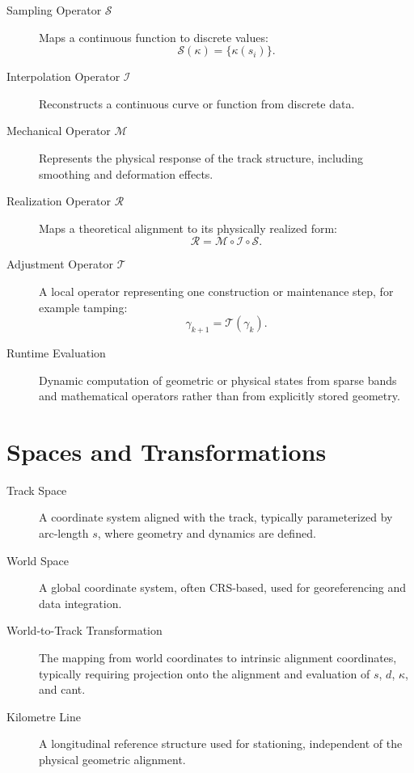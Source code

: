 \begin{description}

\item[Sampling Operator \(\mathcal{S}\)]
Maps a continuous function to discrete values:
\[
\mathcal{S}(\kappa)=\{\kappa(s_i)\}.
\]

\item[Interpolation Operator \(\mathcal{I}\)]
Reconstructs a continuous curve or function from discrete data.

\item[Mechanical Operator \(\mathcal{M}\)]
Represents the physical response of the track structure, including
smoothing and deformation effects.

\item[Realization Operator \(\mathcal{R}\)]
Maps a theoretical alignment to its physically realized form:
\[
\mathcal{R}
=
\mathcal{M}\circ\mathcal{I}\circ\mathcal{S}.
\]

\item[Adjustment Operator \(\mathcal{T}\)]
A local operator representing one construction or maintenance step,
for example tamping:
\[
\gamma_{k+1}
=
\mathcal{T}(\gamma_k).
\]

\item[Runtime Evaluation]
Dynamic computation of geometric or physical states from sparse bands
and mathematical operators rather than from explicitly stored geometry.

\end{description}

\section*{Spaces and Transformations}

\begin{description}

\item[Track Space]
A coordinate system aligned with the track, typically parameterized by
arc-length \(s\), where geometry and dynamics are defined.

\item[World Space]
A global coordinate system, often CRS-based, used for georeferencing and
data integration.

\item[World-to-Track Transformation]
The mapping from world coordinates to intrinsic alignment coordinates,
typically requiring projection onto the alignment and evaluation of
\(s\), \(d\), \(\kappa\), and cant.

\item[Kilometre Line]
A longitudinal reference structure used for stationing, independent of
the physical geometric alignment.

\end{description}

